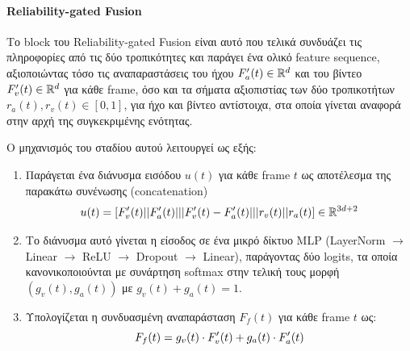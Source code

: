 \paragraph{Reliability-gated Fusion}
\label{ReliabilityFusion}
Το block του Reliability-gated Fusion είναι αυτό που τελικά συνδυάζει τις πληροφορίες από τις δύο τροπικότητες και παράγει ένα ολικό feature sequence, αξιοποιώντας τόσο τις αναπαραστάσεις του ήχου $F_a\sp{\prime}(t) \in \mathbb{R}^d$ και του βίντεο $F_v\sp{\prime}(t) \in \mathbb{R}^d$ για κάθε frame, όσο και τα σήματα αξιοπιστίας των δύο τροπικοτήτων $r_a(t), r_v(t) \in [0,1]$, για ήχο και βίντεο αντίστοιχα, στα οποία γίνεται αναφορά στην αρχή της συγκεκριμένης ενότητας.

Ο μηχανισμός του σταδίου αυτού λειτουργεί ως εξής:

\begin{enumerate}
\item Παράγεται ένα διάνυσμα εισόδου $u(t)$ για κάθε frame $t$ ως αποτέλεσμα της παρακάτω συνένωσης (concatenation)
\[
u(t) = [ F_v\sp{\prime}(t) || F_a\sp{\prime}(t) || \lvert F_v\sp{\prime}(t) - F_a\sp{\prime}(t) \rvert || r_v(t) || r_a(t) ] \in \mathbb{R}^{3d+2}
\]

\item Το διάνυσμα αυτό γίνεται η είσοδος σε ένα μικρό δίκτυο MLP (LayerNorm $\rightarrow$ Linear $\rightarrow$ ReLU $\rightarrow$ Dropout $\rightarrow$ Linear), παράγοντας δύο logits, τα οποία κανονικοποιούνται με συνάρτηση softmax στην τελική τους μορφή $(g_v(t),g_a(t))$ με $g_v(t) + g_a(t) = 1$.

\item Υπολογίζεται η συνδυασμένη αναπαράσταση $F_f(t)$ για κάθε frame $t$ ως:
\[
F_f(t) = g_v(t) \cdot F_v\sp{\prime}(t) + g_a(t) \cdot F_a\sp{\prime}(t)
\]
\end{enumerate}

